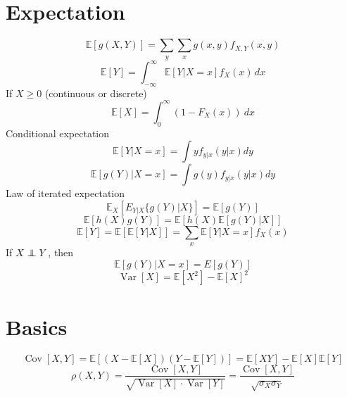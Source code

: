 \documentclass[twocolumn]{amsart}
\newcommand{\E}{\mathbb{E}}
\newcommand{\Cov}{\operatorname{Cov}}
\newcommand{\Var}{\operatorname{Var}}
\newcommand\independent{\protect\mathpalette{\protect\independenT}{\perp}}
\def\independenT#1#2{\mathrel{\rlap{$#1#2$}\mkern3mu{#1#2}}}
\begin{document}
\section*{Expectation}
\begin{equation*}
  \E[g(X,Y)] = \sum_{y}\sum_{x}g(x,y)f_{X,Y}(x,y)
\end{equation*}
\begin{equation*}
  \E[Y] = \int_{-\infty}^{\infty}\E[Y|X=x]f_{X}(x)\,dx
\end{equation*}
If $X\geq 0$ (continuous or discrete)
\begin{equation*}
  \E[X] = \int_{0}^{\infty}(1-F_{X}(x))~dx
\end{equation*}
Conditional expectation
\begin{equation*}
  \E[Y|X=x] = \int y f_{y|x}(y|x)dy
\end{equation*}
\begin{equation*}
  \E[g(Y)|X=x] = \int g(y) f_{y|x}(y|x)dy
\end{equation*}
Law of iterated expectation
\begin{equation*}
  \E_{X}[E_{Y|X}\{g(Y)|X\}] = \E[g(Y)]
\end{equation*}
\begin{equation*}
  \E[h(X)g(Y)] = \E[h(X)\E[g(Y)|X]]
\end{equation*}
\begin{equation*}
  \E[Y]=\E[\E[Y|X]] = \sum_{x}\E[Y|X = x]f_{X}(x)
\end{equation*}
If \(X \independent Y\), then
\begin{equation*}
  \E[g(Y) | X=x] = E[g(Y)]
\end{equation*}
\begin{equation*}
  \Var[X] = \E[X^{2}] - \E[X]^{2}
\end{equation*}

\section*{Basics}
\begin{equation*}
  \Cov[X,Y] = \E[(X-\E[X])(Y-\E[Y])] = \E[XY] - \E[X]\E[Y]
\end{equation*}
\begin{equation*}
  \rho(X,Y) = \frac{\Cov[X,Y]}{\sqrt{\Var[X]\cdot\Var[Y]}} = \frac{\Cov[X,Y]}{\sqrt{\sigma_{X}\sigma_{Y}}}
\end{equation*}
\end{document}
